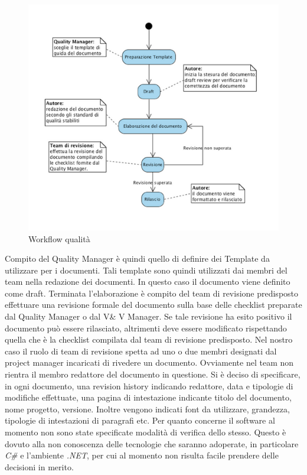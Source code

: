\begin{figure}[tp]
\centering
\includegraphics[scale=.5]{img/11.png}
\caption{Workflow qualit\`{a}}
\label{fig:cd}
\end{figure}
Compito del Quality Manager \`{e} quindi quello di definire dei Template da utilizzare per i documenti. Tali template sono quindi utilizzati dai membri del team nella redazione dei documenti.
In questo caso il documento viene definito come draft. Terminata l\rq elaborazione \`{e} compito del team di revisione predisposto effettuare una revisione formale del documento sulla base delle checklist preparate dal Quality Manager o dal V\& V Manager. 
Se tale revisione ha esito positivo il documento pu\`{o} essere rilasciato, altrimenti deve essere modificato rispettando quella che \`{e} la checklist compilata dal team di revisione predisposto.
Nel nostro caso il ruolo di team di revisione spetta ad uno o due membri designati dal project manager incaricati di rivedere un documento. Ovviamente nel team non rientra il membro redattore del documento in questione.
Si \`{e} deciso di specificare, in ogni documento, una revision history indicando redattore, data e tipologie di modifiche effettuate, una pagina di intestazione indicante titolo del documento, nome progetto, versione. 
Inoltre vengono indicati font da utilizzare, grandezza, tipologie di intestazioni di paragrafi etc.
Per quanto concerne il software al momento non sono state specificate modalit\`{a} di verifica dello stesso. Questo \`{e} dovuto alla non conoscenza delle tecnologie che saranno adoperate, in particolare \emph{C\#} e l\rq ambiente \emph{.NET}, per cui al momento non risulta facile prendere delle decisioni in merito.
